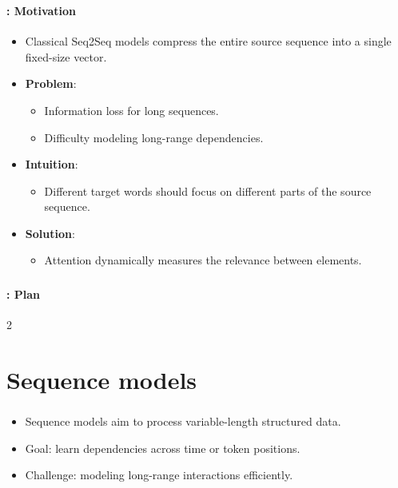 \documentclass[xcolor=table]{beamer}
\subtitle[Attention]{Attention}
\begin{document}
	
	\begin{frame}
		\frametitle{\inserttitle}
		\framesubtitle{\insertshortsubtitle: Motivation}
		
		\begin{itemize}
			
			\item Classical Seq2Seq models compress the entire source sequence into a single fixed-size vector.
			
			\item \textbf{Problem}:
			\begin{itemize}
				\item Information loss for long sequences.
				\item Difficulty modeling long-range dependencies.
			\end{itemize}
			
			\item \textbf{Intuition}:
			\begin{itemize}
				\item Different target words should focus on different parts of the source sequence.
			\end{itemize}
			
			\item \textbf{Solution}:
			\begin{itemize}
				\item Attention dynamically measures the relevance between elements.
			\end{itemize}
			
		\end{itemize}
		
	\end{frame}
	
	\begin{frame}
		\frametitle{\inserttitle}
		\framesubtitle{\insertshortsubtitle: Plan}
		
		\begin{multicols}{2}
			\tableofcontents
		\end{multicols}
	\end{frame}
	
	\section{Sequence models}
	
	\begin{frame}
		\frametitle{\insertshortsubtitle}
		\framesubtitle{\insertsection}
		
		\begin{itemize}
			\item Sequence models aim to process variable-length structured data.
			\item Goal: learn dependencies across time or token positions.
			\item Challenge: modeling long-range interactions efficiently.
		\end{itemize}
		
	\end{frame}
	
\end{document}
